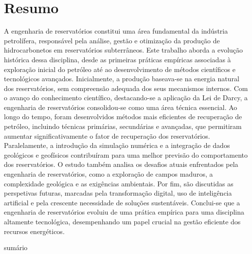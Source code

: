 \documentclass[12pt,a4paper]{report}
\begin{document}
\chapter*{Resumo}
A engenharia de reservatórios constitui uma área fundamental da indústria petrolífera, responsável pela análise, gestão e otimização da produção de hidrocarbonetos em reservatórios subterrâneos. Este trabalho aborda a evolução histórica dessa disciplina, desde as primeiras práticas empíricas associadas à exploração inicial do petróleo até ao desenvolvimento de métodos científicos e tecnológicos avançados. Inicialmente, a produção baseava-se na energia natural dos reservatórios, sem compreensão adequada dos seus mecanismos internos. Com o avanço do conhecimento científico, destacando-se a aplicação da Lei de Darcy, a engenharia de reservatórios consolidou-se como uma área técnica essencial.
Ao longo do tempo, foram desenvolvidos métodos mais eficientes de recuperação de petróleo, incluindo técnicas primárias, secundárias e avançadas, que permitiram aumentar significativamente o fator de recuperação dos reservatórios. Paralelamente, a introdução da simulação numérica e a integração de dados geológicos e geofísicos contribuíram para uma melhor previsão do comportamento dos reservatórios.
O estudo também analisa os desafios atuais enfrentados pela engenharia de reservatórios, como a exploração de campos maduros, a complexidade geológica e as exigências ambientais. Por fim, são discutidas as perspetivas futuras, marcadas pela transformação digital, uso de inteligência artificial e pela crescente necessidade de soluções sustentáveis. Conclui-se que a engenharia de reservatórios evoluiu de uma prática empírica para uma disciplina altamente tecnológica, desempenhando um papel crucial na gestão eficiente dos recursos energéticos.
sumário
\thispagestyle{plain}



\end{document}
